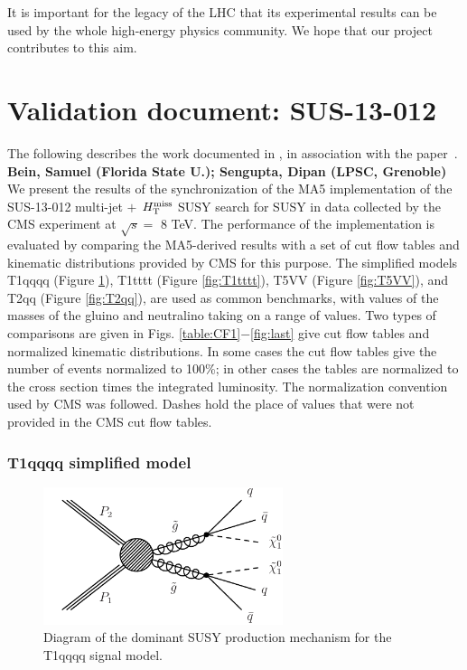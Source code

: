 It is important for the legacy of the LHC that its experimental results can be used by the whole high-energy physics community. We hope that our project contributes to this aim. 

\section{Validation document: SUS-13-012}
\label{app:ma5multijet}
The following describes the work documented in \cite{MA5-CMS-SUS-13-012}, in association with the paper~\cite{MA5-CMS-SUS-13-012}.
\textbf{Bein, Samuel (Florida State U.); Sengupta, Dipan (LPSC, Grenoble)}\\
We present the results of the synchronization of the MA5
implementation of the SUS-13-012 multi-jet $+$ $H_{\text{T}}^{\rm miss}$ SUSY search for SUSY in data collected 
by the CMS experiment at $\sqrt{s}=$ 8 TeV.  The
performance of the implementation is evaluated by comparing the
MA5-derived results with a set of cut flow tables and kinematic
distributions provided by CMS for this purpose. The simplified models
T1qqqq (Figure \ref{fig:T1qqqq}), T1tttt (Figure \ref{fig:T1tttt}), T5VV (Figure \ref{fig:T5VV}), and T2qq (Figure \ref{fig:T2qq}), are used as common benchmarks, with values of the masses of the
gluino and neutralino taking on a range of values. Two types of
comparisons are given in Figs. \ref{table:CF1}$-$\ref{fig:last} give cut flow tables and normalized
kinematic distributions. In some cases the
cut flow tables give the number of events normalized to 100\%; in
other cases the tables are normalized to the cross section times the
integrated luminosity. The normalization convention used by CMS was
followed. Dashes hold the place of values that were not
provided in the CMS cut flow tables. 

\subsubsection{T1qqqq simplified model}
\begin{figure}[h!]
\centering
\includegraphics[width=7cm]{figures/Appendices/Ma5ValidationSUS13012/T1qqqq.pdf}
\caption{Diagram of the dominant SUSY production mechanism
for the T1qqqq signal model.}
\label{fig:T1qqqq}
\end{figure}

